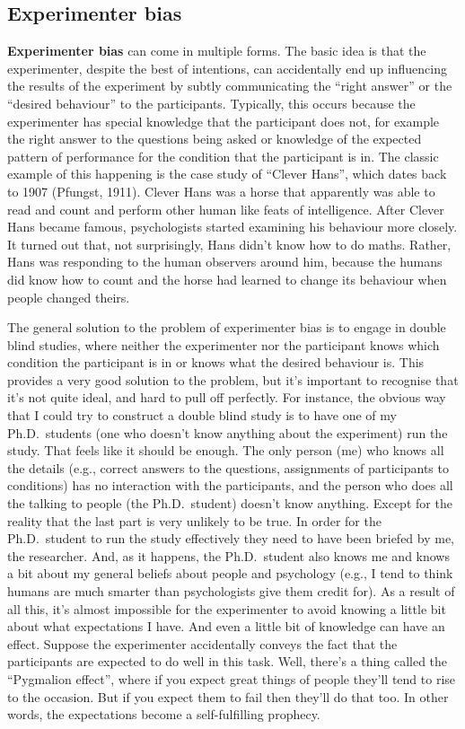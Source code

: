 \documentclass[
  a4paper,
]{book}
\begin{document}
\subsection{Experimenter bias}\label{experimenter-bias}

\textbf{Experimenter bias} can come in multiple forms. The basic idea is
that the experimenter, despite the best of intentions, can accidentally
end up influencing the results of the experiment by subtly communicating
the ``right answer'' or the ``desired behaviour'' to the participants.
Typically, this occurs because the experimenter has special knowledge
that the participant does not, for example the right answer to the
questions being asked or knowledge of the expected pattern of
performance for the condition that the participant is in. The classic
example of this happening is the case study of ``Clever Hans'', which
dates back to 1907 (Pfungst, 1911). Clever Hans was a horse that
apparently was able to read and count and perform other human like feats
of intelligence. After Clever Hans became famous, psychologists started
examining his behaviour more closely. It turned out that, not
surprisingly, Hans didn't know how to do maths. Rather, Hans was
responding to the human observers around him, because the humans did
know how to count and the horse had learned to change its behaviour when
people changed theirs.

The general solution to the problem of experimenter bias is to engage in
double blind studies, where neither the experimenter nor the participant
knows which condition the participant is in or knows what the desired
behaviour is. This provides a very good solution to the problem, but
it's important to recognise that it's not quite ideal, and hard to pull
off perfectly. For instance, the obvious way that I could try to
construct a double blind study is to have one of my Ph.D.~students (one
who doesn't know anything about the experiment) run the study. That
feels like it should be enough. The only person (me) who knows all the
details (e.g., correct answers to the questions, assignments of
participants to conditions) has no interaction with the participants,
and the person who does all the talking to people (the Ph.D.~student)
doesn't know anything. Except for the reality that the last part is very
unlikely to be true. In order for the Ph.D.~student to run the study
effectively they need to have been briefed by me, the researcher. And,
as it happens, the Ph.D.~student also knows me and knows a bit about my
general beliefs about people and psychology (e.g., I tend to think
humans are much smarter than psychologists give them credit for). As a
result of all this, it's almost impossible for the experimenter to avoid
knowing a little bit about what expectations I have. And even a little
bit of knowledge can have an effect. Suppose the experimenter
accidentally conveys the fact that the participants are expected to do
well in this task. Well, there's a thing called the ``Pygmalion
effect'', where if you expect great things of people they'll tend to
rise to the occasion. But if you expect them to fail then they'll do
that too. In other words, the expectations become a self-fulfilling
prophecy.
\end{document}
